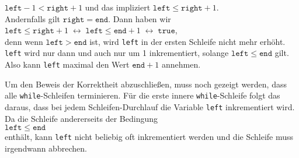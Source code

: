 \begin{enumerate}
      \hspace*{1.3cm} $\mathtt{left} - 1 < \mathtt{right} + 1$ \quad und das impliziert \quad $\mathtt{left} \leq \mathtt{right} + 1$. 
      \\[0.1cm]
      Andernfalls gilt $\texttt{right}=\mathtt{end}$.  Dann haben wir 
      \\[0.1cm]
      \hspace*{1.3cm}
      $\mathtt{left} \leq \mathtt{right} + 1 \;\leftrightarrow\;
       \mathtt{left} \leq \mathtt{end} + 1 \;\leftrightarrow\; \mathtt{true}$,
      \\[0.1cm]
      denn wenn $\texttt{left} > \mathtt{end}$ ist, wird \texttt{left} in der ersten
      Schleife nicht mehr erh\"oht.  \texttt{left} wird nur dann und auch nur um 1
      inkrementiert, solange $\texttt{left} \leq \mathtt{end}$ gilt.
      Also kann \texttt{left} maximal den Wert $\texttt{end} + 1$ annehmen.
\end{enumerate}
Um den Beweis der Korrektheit abzuschlie{\ss}en, muss noch gezeigt werden, dass 
alle \texttt{while}-Schleifen terminieren.  F\"ur die erste innere
\texttt{while}-Schleife folgt das daraus, dass bei jedem Schleifen-Durchlauf die Variable
\texttt{left} inkrementiert wird.  Da die Schleife andererseits der Bedingung \\[0.1cm]
\hspace*{1.3cm} $\texttt{left} \leq \mathtt{end}$ \\[0.1cm]
enth\"alt, kann \texttt{left} nicht beliebig oft inkrementiert werden und die Schleife muss
irgendwann abbrechen. 

